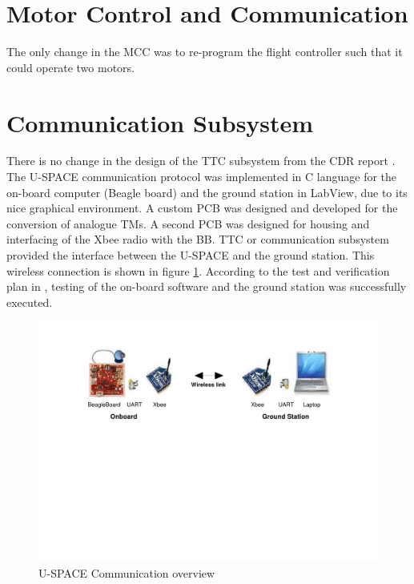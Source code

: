 \section{Motor Control and Communication}
%
The only change in the \ac{MCC} was to re-program the flight controller such that it could operate two motors. 
%
%
%


\section{Communication Subsystem}
\label{sec:com}
There is no change in the design of the \ac{TTC} subsystem from the CDR report \cite{CDR_TTC}. The \ac{U-SPACE} communication protocol was implemented in C language for the on-board computer (Beagle board) and the ground station in LabView, due to its nice graphical environment. A custom \ac{PCB} was designed and developed for the conversion of analogue \acp{TM}. A second \ac{PCB} was designed for housing and interfacing of the Xbee radio with the \ac{BB}. \ac{TTC} or communication subsystem provided the interface between the \ac{U-SPACE} and the ground station. This wireless connection is shown in figure \ref{fig:com_setup}. According to the test and verification plan in \cite{CDR_TTC}, testing of the on-board software and the ground station was successfully executed.
%
\begin{figure}[bht]
\centering
\includegraphics[width=\textwidth]{figures/com_setup.pdf}
\caption[\ac{U-SPACE}Communication overview]{\ac{U-SPACE} Communication overview}
\label{fig:com_setup}
\end{figure}
%
